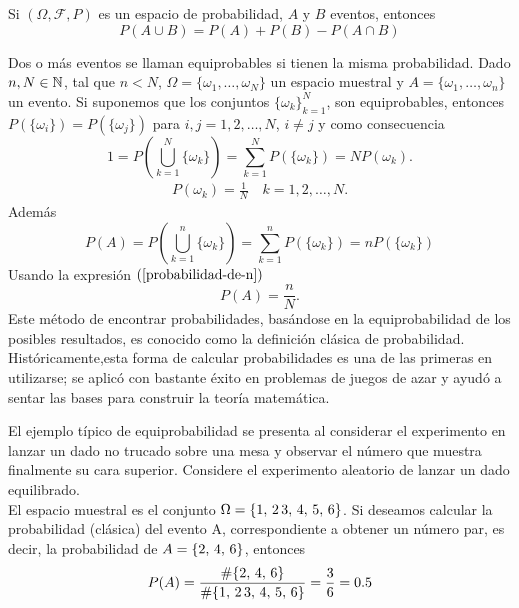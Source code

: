 \begin{Cor}
    Si $(\Omega,\mathscr{F},P)$ es un espacio de probabilidad, $A$ y $B$ eventos, entonces
    $$P(A\cup B)=P(A)+P(B)-P(A\cap B)$$
\end{Cor}
Dos o más eventos se llaman equiprobables si tienen la misma probabilidad.
Dado $n,N\in{\mathbb{N}}$, tal que $n<N$, $\Omega=\{\omega_1,\ldots,\omega_N\}$ un espacio muestral y $A=\{\omega_1,\ldots,\omega_n\}$ un evento.
Si suponemos que los conjuntos  $\{\omega_k\}_{k=1}^N$, son equiprobables, entonces $P(\{\omega_i\})=P(\{\omega_j\})$ para $i,j=1,2,\ldots,N$, $i\not=j$ y como consecuencia $$1=P(\bigcup_{k=1}^N \{\omega_k\})=\sum_{k=1}^N P(\{\omega_k\})=N P(\omega_k).$$
\begin{eqnarray}
    \label{probabilidad-de-n}
    P(\omega_k)=\frac{1}{N}\quad k=1,2,\ldots ,N.
\end{eqnarray}
Además
$$P(A)=P(\bigcup_{k=1}^n \{\omega_k\})=\sum_{k=1}^n P(\{\omega_k\})=n P(\{\omega_k\})$$
Usando la expresión $(\ref{probabilidad-de-n})$
$$P(A)=\frac{n}{N}.$$
Este método de encontrar probabilidades, basándose en la equiprobabilidad de los posibles resultados, es conocido como la definición clásica de probabilidad.\\
Históricamente,esta forma de calcular probabilidades es una de las primeras en utilizarse; se aplicó con bastante éxito en problemas de juegos de azar y ayudó a sentar las bases para construir la teoría matemática.
\begin{Def}
\end{Def}
\begin{Ejm}
    El ejemplo típico de equiprobabilidad se presenta al considerar el experimento  en lanzar un dado no trucado sobre una mesa y observar el número que muestra finalmente su cara superior. Considere el experimento aleatorio de lanzar un dado equilibrado.\\ El espacio muestral es el conjunto  $\Omega=\{1,\thinspace 2\thinspace 3,\thinspace 4,\thinspace 5,\thinspace 6\}$. Si deseamos calcular la probabilidad (clásica) del evento A, correspondiente a obtener un número par, es decir, la probabilidad de $A=\{2,\thinspace 4,\thinspace 6\}$, entonces $$P(A)=\frac{\#\{2,\thinspace 4,\thinspace 6\}}{\#\{1,\thinspace 2\thinspace 3,\thinspace 4,\thinspace 5,\thinspace 6\}}=\frac{3}{6}=0.5$$
\end{Ejm}
